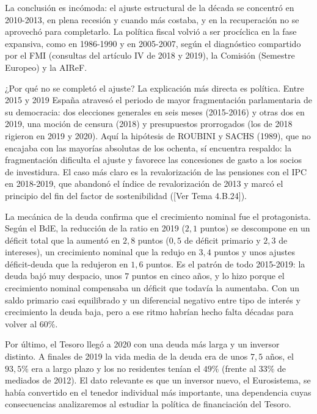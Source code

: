 \documentclass[10pt,a4paper]{article}
\newcommand{\authorfont}[1]{{\fontfamily{EBGaramond-TLF}\selectfont #1}}
\begin{document}
La conclusión es incómoda: el ajuste estructural de la década se concentró en 2010-2013, en plena recesión y cuando más costaba, y en la recuperación no se aprovechó para completarlo. La política fiscal volvió a ser procíclica en la fase expansiva, como en 1986-1990 y en 2005-2007, según el diagnóstico compartido por el FMI (consultas del artículo IV de 2018 y 2019), la Comisión (Semestre Europeo) y la AIReF.

¿Por qué no se completó el ajuste? La explicación más directa es política. Entre 2015 y 2019 España atravesó el periodo de mayor fragmentación parlamentaria de su democracia: dos elecciones generales en seis meses (2015-2016) y otras dos en 2019, una moción de censura (2018) y presupuestos prorrogados (los de 2018 rigieron en 2019 y 2020). Aquí la hipótesis de ROUBINI y SACHS (1989), que no encajaba con las mayorías absolutas de los ochenta, sí encuentra respaldo: la fragmentación dificulta el ajuste y favorece las concesiones de gasto a los socios de investidura. El caso más claro es la revalorización de las pensiones con el IPC en 2018-2019, que abandonó el índice de revalorización de 2013 y marcó el principio del fin del factor de sostenibilidad ([\authorfont{Ver Tema 4.B.24}]).

La mecánica de la deuda confirma que el crecimiento nominal fue el protagonista. Según el BdE, la reducción de la ratio en 2019 ($2,1$ puntos) se descompone en un déficit total que la aumentó en $2,8$ puntos ($0,5$ de déficit primario y $2,3$ de intereses), un crecimiento nominal que la redujo en $3,4$ puntos y unos ajustes déficit-deuda que la redujeron en $1,6$ puntos. Es el patrón de todo 2015-2019: la deuda bajó muy despacio, unos $7$ puntos en cinco años, y lo hizo porque el crecimiento nominal compensaba un déficit que todavía la aumentaba. Con un saldo primario casi equilibrado y un diferencial negativo entre tipo de interés y crecimiento la deuda baja, pero a ese ritmo habrían hecho falta décadas para volver al $60\%$.

Por último, el Tesoro llegó a 2020 con una deuda más larga y un inversor distinto. A finales de 2019 la vida media de la deuda era de unos $7,5$ años, el $93,5\%$ era a largo plazo y los no residentes tenían el $49\%$ (frente al $33\%$ de mediados de 2012). El dato relevante es que un inversor nuevo, el Eurosistema, se había convertido en el tenedor individual más importante, una dependencia cuyas consecuencias analizaremos al estudiar la política de financiación del Tesoro.
\end{document}
